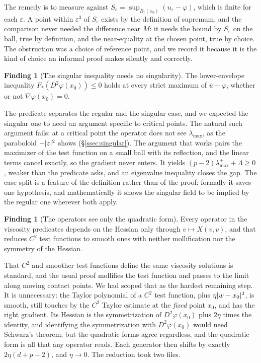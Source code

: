 \documentclass[11pt,reqno]{amsart}
\newcommand{\eps}{\varepsilon}
\DeclarePairedDelimiter{\abs}{\lvert}{\rvert}
\theoremstyle{plain}
\theoremstyle{definition}
\newtheorem{finding}[theorem]{Finding}
\begin{document}
The remedy is to measure against
$S_\eps = \sup_{\overline{B}_r(x_0)} (u_\eps - \varphi)$, which is finite for
each $\eps$. A point within $\eps^3$ of $S_\eps$ exists by the definition of
supremum, and the comparison never needed the difference near $M$: it needs the
bound by $S_\eps$ on the ball, true by definition, and the near-equality at the
chosen point, true by choice. The obstruction was a choice of reference point,
and we record it because it is the kind of choice an informal proof makes
silently and correctly.

\begin{finding}[The singular inequality needs no singularity]\label{find:gradfree}
The lower-envelope inequality $F_*(D^2\varphi(x_0)) \le 0$ holds at every strict
maximum of $\overline{u} - \varphi$, whether or not $\nabla\varphi(x_0) = 0$.
\end{finding}

The predicate separates the regular and the singular case, and we expected the
singular one to need an argument specific to critical points. The natural such
argument fails: at a critical point the operator does not see
$\lambda_{\max}$, as the paraboloid $-\abs{z}^2$ shows (\S\ref{ssec:singular}).
The argument that works pairs the maximizer of the test function on a small
ball with its reflection, and the linear terms cancel exactly, so the gradient
never enters. It yields $(p-2)\lambda_{\max}^+ + \Lambda \ge 0$, weaker than
the predicate asks, and an eigenvalue inequality closes the gap. The case split
is a feature of the definition rather than of the proof; formally it saves one
hypothesis, and mathematically it shows the singular field to be implied by the
regular one wherever both apply.

\begin{finding}[The operators see only the quadratic form]\label{find:quadform}
Every operator in the viscosity predicates depends on the Hessian only through
$v \mapsto X(v,v)$, and that reduces $C^2$ test functions to smooth ones with
neither mollification nor the symmetry of the Hessian.
\end{finding}

That $C^2$ and smoother test functions define the same viscosity solutions is
standard, and the usual proof mollifies the test function and passes to the
limit along moving contact points. We had scoped that as the hardest remaining
step. It is unnecessary: the Taylor polynomial of a $C^2$ test function, plus
$\eta\abs{w - x_0}^2$, is smooth, still touches by the $C^2$ Taylor estimate at
the \emph{fixed} point $x_0$, and has the right gradient. Its Hessian is the
symmetrization of $D^2\varphi(x_0)$ plus $2\eta$ times the identity, and
identifying the symmetrization with $D^2\varphi(x_0)$ would need Schwarz's
theorem; but the quadratic forms agree regardless, and the quadratic form is all
that any operator reads. Each generator then shifts by exactly
$2\eta(d + p - 2)$, and $\eta \to 0$. The reduction took two files.
\end{document}
